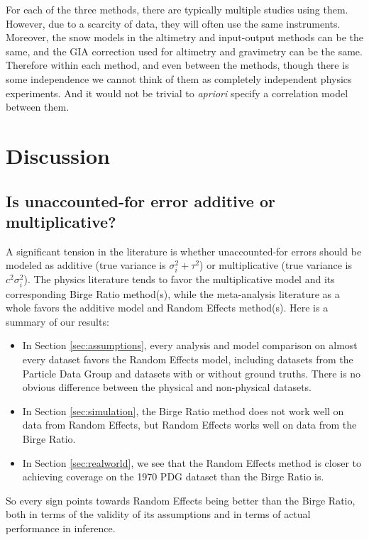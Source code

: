 \documentclass[letterpaper,12pt]{article}
\begin{document}
For each of the three methods, there are typically multiple studies using them. However, due to a scarcity of data, they will often use the same instruments. Moreover, the snow models in the altimetry and input-output methods can be the same, and the GIA correction used for altimetry and gravimetry can be the same. Therefore within each method, and even between the methods, though there is some independence we cannot think of them as completely independent physics experiments. And it would not be trivial to \textit{apriori} specify a correlation model between them.

\section{Discussion}\label{discussion-2}

\subsection{Is unaccounted-for error additive or multiplicative?}
A significant tension in the literature is whether unaccounted-for errors should be modeled as additive (true variance is $\sigma_i^2+\tau^2$) or multiplicative (true variance is $c^2\sigma_i^2$). The physics literature tends to favor the multiplicative model and its corresponding Birge Ratio method(s), while the meta-analysis literature as a whole favors the additive model and Random Effects method(s). Here is a summary of our results:

\begin{itemize}
  \item In Section \ref{sec:assumptions}, every analysis and model comparison on almost every dataset favors the Random Effects model, including datasets from the Particle Data Group and datasets with or without ground truths. There is no obvious difference between the physical and non-physical datasets.
  \item In Section \ref{sec:simulation}, the Birge Ratio method does not work well on data from Random Effects, but Random Effects works well on data from the Birge Ratio.
  \item In Section \ref{sec:realworld}, we see that the Random Effects method is closer to achieving coverage on the 1970 PDG dataset than the Birge Ratio is.
\end{itemize}
So every sign points towards Random Effects being better than the Birge Ratio, both in terms of the validity of its assumptions and in terms of actual performance in inference.
\end{document}

